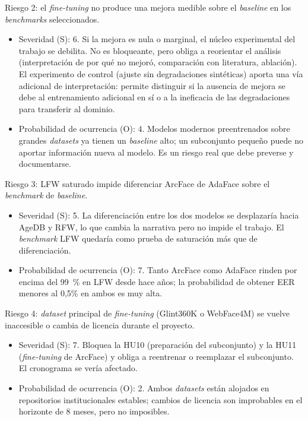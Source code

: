 \documentclass[
  11pt, %
]{charter}
\begin{document}
Riesgo 2: el \textit{fine-tuning} no produce una mejora medible sobre el \textit{baseline} en los \textit{benchmarks} seleccionados.

\begin{itemize}
\item Severidad (S): 6. Si la mejora es nula o marginal, el núcleo experimental del trabajo se debilita. No es bloqueante, pero obliga a reorientar el análisis (interpretación de por qué no mejoró, comparación con literatura, ablación). El experimento de control (ajuste sin degradaciones sintéticas) aporta una vía adicional de interpretación: permite distinguir si la ausencia de mejora se debe al entrenamiento adicional en sí o a la ineficacia de las degradaciones para transferir al dominio.
\item Probabilidad de ocurrencia (O): 4. Modelos modernos preentrenados sobre grandes \textit{datasets} ya tienen un \textit{baseline} alto; un subconjunto pequeño puede no aportar información nueva al modelo. Es un riesgo real que debe preverse y documentarse.
\end{itemize}

Riesgo 3: LFW saturado impide diferenciar ArcFace de AdaFace sobre el \textit{benchmark} de \textit{baseline}.

\begin{itemize}
\item Severidad (S): 5. La diferenciación entre los dos modelos se desplazaría hacia AgeDB y RFW, lo que cambia la narrativa pero no impide el trabajo. El \textit{benchmark} LFW quedaría como prueba de saturación más que de diferenciación.
\item Probabilidad de ocurrencia (O): 7. Tanto ArcFace como AdaFace rinden por encima del 99~\% en LFW desde hace años; la probabilidad de obtener EER menores al 0{,}5\% en ambos es muy alta.
\end{itemize}

Riesgo 4: \textit{dataset} principal de \textit{fine-tuning} (Glint360K o WebFace4M) se vuelve inaccesible o cambia de licencia durante el proyecto.

\begin{itemize}
\item Severidad (S): 7. Bloquea la HU10 (preparación del subconjunto) y la HU11 (\textit{fine-tuning} de ArcFace) y obliga a reentrenar o reemplazar el subconjunto. El cronograma se vería afectado.
\item Probabilidad de ocurrencia (O): 2. Ambos \textit{datasets} están alojados en repositorios institucionales estables; cambios de licencia son improbables en el horizonte de 8 meses, pero no imposibles.
\end{itemize}
\end{document}
